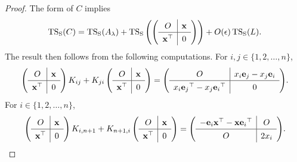 \documentclass[11pt]{article}
\theoremstyle{definition}
\theoremstyle{definition}
\theoremstyle{definition}
\DeclareMathOperator{\TS}{TS_S}
\newcommand{\bx}{{\bf x}}
\newcommand{\be}{{\bf e}}
\def\trans{^{\top}}
\begin{document}
\begin{proof}
The form of $C$ implies 
\[ \TS(C) = \TS(A_{\lambda}) + \TS \left( \renewcommand{\arraystretch}{1.3}
\left( \begin{array}{c|c} O & {\bf x} \\ \hline \mathbf{x}\trans &  0\end{array} \right) \right) 
+ O(\epsilon)\TS(L).
\]
The result then follows from the following computations.
For $i,j \in \{1,2, \ldots, n\}$, 
\[  \left( \renewcommand{\arraystretch}{1.3}\begin{array}{c|c} O & \bx \\ \hline \bx\trans &  0\end{array} \right)K_{ij}
+ K_{ji}\left(\renewcommand{\arraystretch}{1.3} \begin{array}{c|c} O & \bx \\ \hline \bx\trans &  0\end{array} \right)
= \left(\renewcommand{\arraystretch}{1.3} \begin{array}{c|c}
O & x_i{\be_j}-x_j {\be_i}\\ \hline 
 x_i{\be_j}\trans-x_j {\be_i}\trans & 0 \end{array} \right)
\!.\]
For $i\in \{1,2,\ldots, n\}$, 
\[ \left(\renewcommand{\arraystretch}{1.3} \begin{array}{c|c} O & \mathbf{x} \\ \hline \mathbf{x}\trans &  0\end{array} \right)K_{i,n+1} + 
K_{n+1,i}\left(\renewcommand{\arraystretch}{1.3} \begin{array}{c|c} O & \mathbf{ x} \\ \hline \mathbf{x}\trans &  0\end{array} \right)= {\left(\renewcommand{\arraystretch}{1.3} \begin{array}{c|c} -{\be_i}\bx\trans -\bx{\be_i}\trans & O \\ \hline 
O & 2x_i \end{array} \right)\!.} \qedhere
\]
\end{proof}
\end{document}

